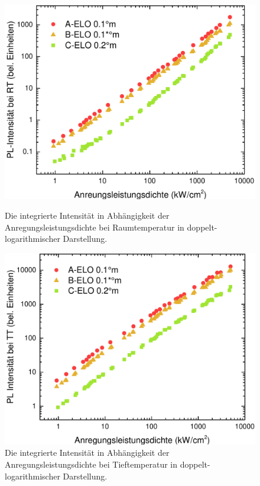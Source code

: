 \begin{figure}[htb]
  \centering
  \begin{minipage}[t]{0.49\textwidth}
    \centering
    \includegraphics[width=\textwidth]{Bilder/TS4045/intRT.pdf}
		\caption{Die integrierte Intensität in Abhängigkeit der Anregungsleistungsdichte bei Raumtemperatur in doppelt-logarithmischer Darstellung.}
    \label{fig:eloINTrt}
  \end{minipage}
	\hfill
  \begin{minipage}[t]{0.49\textwidth}
    \centering
    \includegraphics[width=\linewidth]{Bilder/TS4045/intTT.pdf}
		\caption{Die integrierte Intensität in Abhängigkeit der Anregungsleistungsdichte bei Tieftemperatur in doppelt-logarithmischer Darstellung.}
    \label{fig:eloINTtt}
  \end{minipage}
\end{figure}
